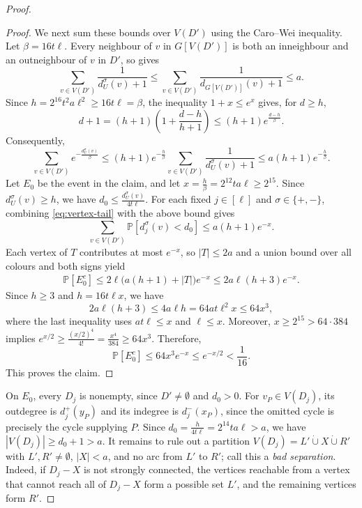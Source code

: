 \documentclass[11pt,a4paper]{article}
\theoremstyle{remark}
\numberwithin{equation}{section}
\newcommand{\Prob}{\mathbb{P}}
\begin{document}
\begin{proof}
\begin{proof}
			We next sum these bounds over $V(D')$ using the Caro--Wei inequality.
			Let $\beta =16t\ell$. Every neighbour of $v$ in $G[V(D')]$ is both an
			inneighbour and an outneighbour of $v$ in $D'$, so
			 gives
			\[
			\sum_{v\in V(D')}\frac{1}{d_U^\sigma(v)+1}
			\le
			\sum_{v\in V(D')}\frac{1}{d_{G[V(D')]}(v)+1}
			\le a.
			\]
			Since $h=2^{16}t^2a\ell^2\ge16t\ell=\beta $, the inequality $1+x\le e^x$ gives, for $d\ge h$,
			\[
			d+1=(h+1)\left(1+\frac{d-h}{h+1}\right)
			\le(h+1)e^{\frac{d-h}{\beta }}.
			\]
			Consequently,
			\[
			\sum_{v\in V(D')}e^{-\frac{d_U^\sigma(v)}{\beta }}
			\le(h+1)e^{-\frac{h}{\beta }}\sum_{v\in V(D')}\frac{1}{d_U^\sigma(v)+1}
			\le a(h+1)e^{-\frac{h}{\beta }}.
			\]
			Let $E_0$ be the event in the claim, and let
			$x=\frac{h}{\beta}=2^{12}ta\ell\ge2^{15}$.
			Since $d_U^\sigma(v)\ge h$, we have
			$d_0\le \frac{d_U^\sigma(v)}{4t\ell}$.
			For each fixed $j\in[\ell]$ and $\sigma\in\{+,-\}$,
			combining \eqref{eq:vertex-tail} with the above bound gives
			\[
			\sum_{v\in V(D')}\Prob[d_j^\sigma(v)<d_0]
			\le a(h+1)e^{-x}.
			\]
			Each vertex of $T$ contributes at most $e^{-x}$, so
			$|T|\le2a$ and a union bound over all colours and both signs yield
			\[
			\begin{aligned}
				\Prob[E_0^c]
				\le2\ell\bigl(a(h+1)+|T|\bigr)e^{-x}
				\le2a\ell(h+3)e^{-x}.
			\end{aligned}
			\]
			Since $h\ge3$ and $h=16t\ell x$, we have
			\[
			2a\ell(h+3)
			\le4a\ell h
			=64at\ell^2x
			\le64x^3,
			\]
			where the last inequality uses $at\ell\le x$ and $\ell\le x$.
			Moreover, $x\ge2^{15}>64\cdot384$ implies
			$
			e^{x/2}\ge\frac{(x/2)^4}{4!}
			=\frac{x^4}{384}\ge64x^3.
			$
			Therefore,
			\begin{equation}\label{eq:neighbour-failure}
				\Prob[E_0^c]\le64x^3e^{-x}\le e^{-x/2}<\frac{1}{16}.
			\end{equation}
			This proves the claim.
		\end{proof}
		
		On $E_0$, every $D_j$ is nonempty, since $D'\ne\emptyset$ and $d_0>0$.
		For $v_P\in V(D_j)$, its outdegree is $d_j^+(y_P)$ and its indegree is
		$d_j^-(x_P)$, since the omitted cycle is precisely the cycle supplying $P$.
		Since $d_0=\frac{h}{4t\ell}=2^{14}ta\ell>a$, we have $|V(D_j)|\ge d_0+1>a$.
		It remains to rule out a partition
		$V(D_j)=L'\mathbin{\dot\cup}X\mathbin{\dot\cup}R'$ with $L',R'\ne\emptyset$,
		$|X|<a$, and no arc from $L'$ to $R'$; call this a \emph{bad separation}.
		Indeed, if $D_j-X$ is not strongly connected, the vertices reachable from a
		vertex that cannot reach all of $D_j-X$ form a possible set $L'$, and the
		remaining vertices form $R'$.
		

\end{proof}
\end{document}
